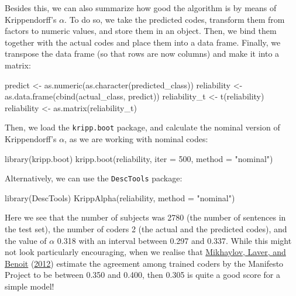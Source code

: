 \documentclass[
]{book}
\newenvironment{Shaded}{\begin{snugshade}}{\end{snugshade}}
\newcommand{\AttributeTok}[1]{\textcolor[rgb]{0.77,0.63,0.00}{#1}}
\newcommand{\DecValTok}[1]{\textcolor[rgb]{0.00,0.00,0.81}{#1}}
\newcommand{\FunctionTok}[1]{\textcolor[rgb]{0.00,0.00,0.00}{#1}}
\newcommand{\NormalTok}[1]{#1}
\newcommand{\OtherTok}[1]{\textcolor[rgb]{0.56,0.35,0.01}{#1}}
\newcommand{\StringTok}[1]{\textcolor[rgb]{0.31,0.60,0.02}{#1}}
\begin{document}
Besides this, we can also summarize how good the algorithm is by means of Krippendorff's \(\alpha\). To do so, we take the predicted codes, transform them from factors to numeric values, and store them in an object. Then, we bind them together with the actual codes and place them into a data frame. Finally, we transpose the data frame (so that rows are now columns) and make it into a matrix:

\begin{Shaded}
\begin{Highlighting}[]
\NormalTok{predict }\OtherTok{\textless{}{-}} \FunctionTok{as.numeric}\NormalTok{(}\FunctionTok{as.character}\NormalTok{(predicted\_class))}
\NormalTok{reliability }\OtherTok{\textless{}{-}} \FunctionTok{as.data.frame}\NormalTok{(}\FunctionTok{cbind}\NormalTok{(actual\_class, predict))}
\NormalTok{reliability\_t }\OtherTok{\textless{}{-}} \FunctionTok{t}\NormalTok{(reliability)}
\NormalTok{reliability }\OtherTok{\textless{}{-}} \FunctionTok{as.matrix}\NormalTok{(reliability\_t)}
\end{Highlighting}
\end{Shaded}

Then, we load the \texttt{kripp.boot} package, and calculate the nominal version of Krippendorff's \(\alpha\), as we are working with nominal codes:

\begin{Shaded}
\begin{Highlighting}[]
\FunctionTok{library}\NormalTok{(kripp.boot)}
\FunctionTok{kripp.boot}\NormalTok{(reliability, }\AttributeTok{iter =} \DecValTok{500}\NormalTok{, }\AttributeTok{method =} \StringTok{"nominal"}\NormalTok{)}
\end{Highlighting}
\end{Shaded}

Alternatively, we can use the \texttt{DescTools} package:

\begin{Shaded}
\begin{Highlighting}[]
\FunctionTok{library}\NormalTok{(DescTools)}
\FunctionTok{KrippAlpha}\NormalTok{(reliability, }\AttributeTok{method =} \StringTok{"nominal"}\NormalTok{)}
\end{Highlighting}
\end{Shaded}

Here we see that the number of subjects was 2780 (the number of sentences in the test set), the number of coders 2 (the actual and the predicted codes), and the value of \(\alpha\) 0.318 with an interval between 0.297 and 0.337. While this might not look particularly encouraging, when we realise that \protect\hyperlink{ref-Mikhaylov2012a}{Mikhaylov, Laver, and Benoit} (\protect\hyperlink{ref-Mikhaylov2012a}{2012}) estimate the agreement among trained coders by the Manifesto Project to be between 0.350 and 0.400, then 0.305 is quite a good score for a simple model!
\end{document}
